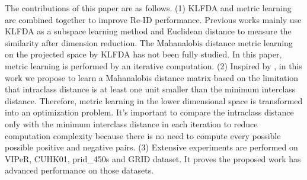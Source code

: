 \documentclass[conference,compsoc]{IEEEtran}
\begin{document}
\indent The contributions of this paper are as follows. (1) KLFDA and metric learning are combined together to improve Re-ID performance. Previous works mainly use KLFDA as a subspace learning method and Euclidean distance to measure the similarity after dimension reduction. The Mahanalobis distance metric learning on the projected space by KLFDA has not been fully studied. In this paper, metric learning is performed by an iterative computation. (2) Inspired by \cite{TDL}, in this work we propose to learn a Mahanalobis distance matrix based on the limitation that intraclass distance is at least one unit smaller than the minimum interclass distance. Therefore, metric learning in the lower dimensional space is transformed into an optimization problem. It's important to compare the intraclass distance only with the minimum interclass distance in each iteration to reduce computation complexity because there is no need to compute every possible possible positive and negative pairs. (3) Extensive experiments are performed on VIPeR, CUHK01, prid\_450s and GRID dataset. It proves the proposed work has advanced performance on those datasets.



%

%
%
\end{document}
